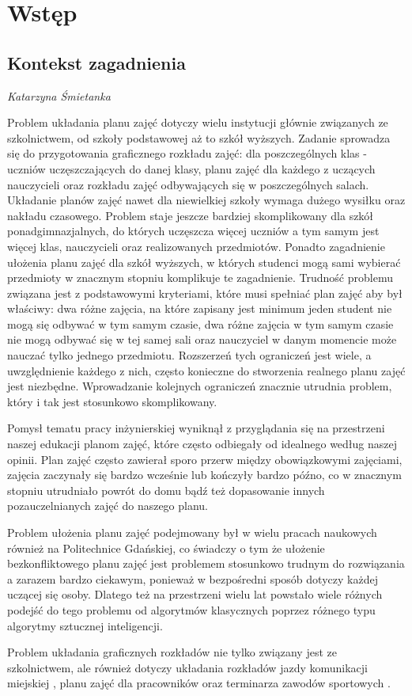 
\chapter{Wstęp}

\section{Kontekst zagadnienia}
\textit{Katarzyna Śmietanka}
\par Problem układania planu zajęć dotyczy wielu instytucji głównie związanych ze szkolnictwem, od szkoły podstawowej aż to szkół wyższych. Zadanie sprowadza się do przygotowania graficznego rozkładu zajęć: dla poszczególnych klas - uczniów uczęszczających do danej klasy, planu zajęć dla każdego z uczących nauczycieli oraz rozkładu zajęć odbywających się w poszczególnych salach. Układanie planów zajęć nawet dla niewielkiej szkoły wymaga dużego wysiłku oraz nakładu czasowego. Problem staje jeszcze bardziej skomplikowany dla szkół ponadgimnazjalnych, do których uczęszcza więcej uczniów a tym samym jest więcej klas, nauczycieli oraz realizowanych przedmiotów. Ponadto zagadnienie ułożenia planu zajęć dla szkół wyższych, w których studenci mogą sami wybierać przedmioty w znacznym stopniu komplikuje te zagadnienie. Trudność problemu związana jest z podstawowymi kryteriami, które musi spełniać plan zajęć aby był właściwy: dwa różne zajęcia, na które zapisany jest minimum jeden student nie mogą się odbywać w tym samym czasie, dwa różne zajęcia w tym samym czasie nie mogą odbywać się w tej samej sali oraz nauczyciel w danym momencie może nauczać tylko jednego przedmiotu. Rozszerzeń tych ograniczeń jest wiele, a uwzględnienie każdego z nich, często konieczne do stworzenia realnego planu zajęć jest niezbędne. Wprowadzanie kolejnych ograniczeń znacznie utrudnia problem, który i tak jest stosunkowo skomplikowany.
\par Pomysł tematu pracy inżynierskiej wyniknął z przyglądania się na przestrzeni naszej edukacji planom zajęć, które często odbiegały od idealnego według naszej opinii. Plan zajęć często zawierał sporo przerw między obowiązkowymi zajęciami, zajęcia zaczynały się bardzo wcześnie lub kończyły bardzo późno, co w znacznym stopniu utrudniało powrót do domu bądź też dopasowanie innych pozauczelnianych zajęć do naszego planu.
\par Problem ułożenia planu zajęć podejmowany był w wielu pracach naukowych również na Politechnice Gdańskiej, co świadczy o tym że ułożenie bezkonfliktowego planu zajęć jest problemem stosunkowo trudnym do rozwiązania a zarazem bardzo ciekawym, ponieważ w bezpośredni sposób dotyczy każdej uczącej się osoby. Dlatego też na przestrzeni wielu lat powstało wiele różnych podejść do tego problemu od algorytmów klasycznych poprzez różnego typu algorytmy sztucznej inteligencji.
\par Problem układania graficznych rozkładów nie tylko związany jest ze szkolnictwem, ale również dotyczy układania rozkładów jazdy komunikacji miejskiej \cite{com}
, planu zajęć dla pracowników \cite{worker} oraz terminarza zawodów sportowych \cite{sport}.
